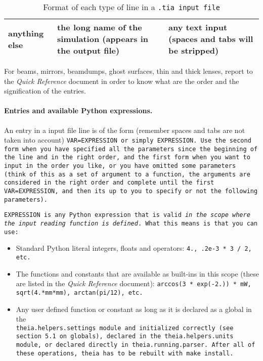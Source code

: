 \documentclass{article}
\begin{document}
\begin{table}[h]
\begin{center}
\begin{tabular}{|p{3cm}|p{4cm}|p{8cm}|}
anything else & the long name of the simulation (appears in the output file) & any text input (spaces and tabs will be stripped) \\ \hline



\end{tabular}
\end{center}
\caption{Format of each type of line in a \tt{.tia} input file}
\label{inputformat}
\end{table}

For beams, mirrors, beamdumps, ghost surfaces, thin and thick lenses, report to the \textit{Quick Reference} document in order to know what are the order and the signification of the entries.

\paragraph{Entries and available Python expressions.}An entry in a input file line is of the form (remember spaces and tabs are not taken into account) \tt{VAR=EXPRESSION} or simply \tt{EXPRESSION}. Use the second form when you have specified all the parameters since the beginning of the line and in the right order, and the first form when you want to input in the order you like, or you have omitted some parameters (think of this as a set of argument to a function, the arguments are considered in the right order and complete until the first \tt{VAR=EXPRESSION}, and then its up to you to specify or not the following parameters).

\tt{EXPRESSION} is any Python expression that is valid \textit{in the scope where the input reading function is defined}. What this means is that you can use:
\begin{itemize}
\item Standard Python literal integers, floats and operators: \tt{4.}, \tt{.2e-3 * 3 / 2}, etc.
\item The functions and constants that are available as built-ins in this scope (these are listed in the \textit{Quick Reference} document): \tt{arccos(3 * exp(-2.)) * mW}, \tt{sqrt(4.*mm*mm)}, \tt{arctan(pi/12)}, etc.
\item Any user defined function or constant as long as it is declared as a global in the \\ \tt{theia.helpers.settings} module and initialized correctly (see section 5.1 on globals), declared in the \tt{theia.helpers.units} module, or declared directly in \tt{theia.running.parser}. After all of these operations, \tt{theia} has to be rebuilt with \tt{make install}.
\end{itemize}
\end{document}
